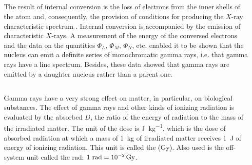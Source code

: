 \subsection{}\label{42.7.4} The result of internal conversion  is the loss of electrons from the inner shells of the atom and, consequently, the provision of conditions for producing the $X$-ray characteristic spectrum . Internal conversion is accompanied by the emission of characteristic $X$-rays. A measurement of the energy of the conversed electrons and the data on the quantities $\Phi_{L}$, $\Phi_{M}$, $\Phi_{N}$, etc.  enabled it to be shown that the nucleus can emit a definite series of monochromatic gamma rays, i.e. that gamma rays have a line spectrum. Besides, these data showed that gamma rays are emitted by a daughter nucleus rather than a parent one.

\subsection{}\label{42.7.5} Gamma rays have a very strong effect on matter, in particular, on biological substances. The effect of gamma rays and other kinds of ionizing radiation is evaluated by the absorbed  $D$, the ratio of the energy of radiation to the mass of the irradiated matter. The unit of the dose is \si{\joule\per\kilo\gram}, which is the dose of absorbed radiation at which a mass of \SI{1}{\kilo\gram} of irradiated matter receives \SI{1}{\joule} of energy of ionizing radiation. This unit is called the  (\si{\gray}). Also used is the off-system unit called the rad: $1~\text{rad} = \SI{d-2}{\gray}$.

